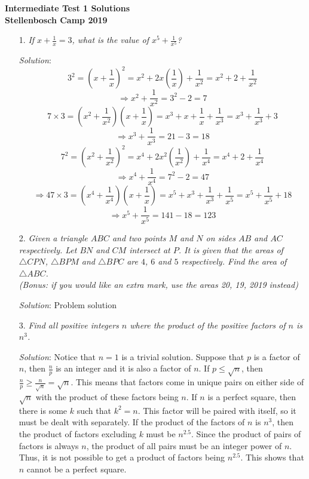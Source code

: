\documentclass{article}
\begin{document}
\begin{center}
  \textbf{\Large Intermediate Test 1 Solutions}
  \\ \vspace{1em}
  \textbf{\large Stellenbosch Camp 2019}
\end{center}


\begin{enumerate}[1.]

\item[1.] %
\textit{If $x + \frac{1}{x} = 3$, what is the value of $x^5 + \frac{1}{x^5}$?}

\textit{Solution}: 
$$3^2 = (x + \frac{1}{x})^2 = x^2 + 2x(\frac{1}{x}) + \frac{1}{x^2} = x^2 + 2 + \frac{1}{x^2}$$
$$\Rightarrow x^2 + \frac{1}{x^2} = 3^2 - 2 = 7$$
$$7 \times 3 = (x^2 + \frac{1}{x^2})(x + \frac{1}{x}) = x^3 + x + \frac{1}{x} + \frac{1}{x^3} = x^3 + \frac{1}{x^3} + 3$$
$$\Rightarrow x^3 + \frac{1}{x^3} = 21 - 3 = 18$$
$$7^2 = (x^2 + \frac{1}{x^2})^2 = x^4 + 2x^2(\frac{1}{x^2}) + \frac{1}{x^4} = x^4 + 2 + \frac{1}{x^4}$$
$$\Rightarrow x^4 + \frac{1}{x^4} = 7^2 - 2 = 47$$
$$\Rightarrow 47 \times 3 = (x^4 + \frac{1}{x^4})(x + \frac{1}{x}) = x^5 + x^3 + \frac{1}{x^3} + \frac{1}{x^5} = x^5 + \frac{1}{x^5} + 18$$
$$\Rightarrow x^5 + \frac{1}{x^5} = 141 - 18 = 123$$

\vspace{6.81mm}

\item[2.] %
\textit{Given a triangle $ABC$ and two points $M$ and $N$ on sides $AB$ and $AC$ respectively. Let $BN$ and $CM$ intersect at $P$. It is given that the areas of $\triangle CPN$, $\triangle BPM$ and $\triangle BPC$ are $4$, $6$ and $5$ respectively.
Find the area of $\triangle ABC$.\\
(Bonus: if you would like an extra mark, use the areas 20, 19, 2019 instead)}

\textit{Solution}: Problem solution

\vspace{6.81mm}

\item[3.] %
\textit{Find all positive integers $n$ where the product of the positive factors of $n$ is $n^3$.}

\textit{Solution}: Notice that $n = 1$ is a trivial solution. Suppose that $p$ is a factor of $n$, then $\frac{n}{p}$ is an integer and it is also a factor of $n$. If $p \le \sqrt{n}$, then $\frac{n}{p} \ge \frac{n}{\sqrt{n}} = \sqrt{n}$.
This means that factors come in unique pairs on either side of $\sqrt{n}$ with the product of these factors being $n$. If $n$ is a perfect square, then there is some $k$ such that $k^2 = n$. This factor will be paired with itself, so it must be dealt with separately.
If the product of the factors of $n$ is $n^3$, then the product of factors excluding $k$ must be $n^{2.5}$. Since the product of pairs of factors is always $n$, the product of all pairs must be an integer power of $n$. Thus, it is not possible to get a product of factors being $n^{2.5}$. This shows that $n$ cannot be a perfect square.\\


\end{enumerate}
\end{document}
